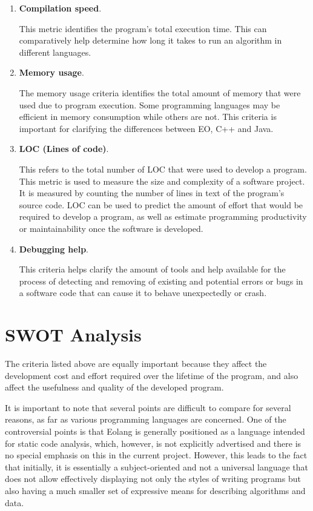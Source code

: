 \documentclass[12pt]{book}
\begin{document}
{{\begin{enumerate}
    \item \textbf{Compilation speed}.
    
This metric identifies the program's total execution time. This can comparatively help determine how long it takes to run an algorithm in different languages.

    \item \textbf{Memory usage}.
    
The memory usage criteria identifies the  total amount of memory that were used due to program execution. Some programming languages may be efficient in memory consumption while others are not. This criteria is important for clarifying the differences between EO, C++ and Java.

    \item \textbf{LOC (Lines of code)}.
    
This refers to the total number of LOC that were used to develop a program. This metric is used to measure the size and complexity of a software project. It is measured by counting the number of lines in text of the program's source code. LOC can be used to predict the amount of effort that would be required to develop a program, as well as estimate programming productivity or maintainability once the software is developed.

    \item \textbf{Debugging help}.
    
This criteria helps clarify the amount of tools and help available for the process of detecting and removing of existing and potential errors or bugs in a software code that can cause it to behave unexpectedly or crash.
\end{enumerate}

\section{SWOT Analysis}

The criteria listed above are equally important because they affect the development cost and effort required over the lifetime of the program, and also affect the usefulness and quality of the developed program.

It is important to note that several points are difficult to compare for several reasons, as far as various programming languages are concerned. One of the controversial points is that Eolang is generally positioned as a language intended for static code analysis, which, however, is not explicitly advertised and there is no special emphasis on this in the current project. However, this leads to the fact that initially, it is essentially a subject-oriented and not a universal language that does not allow effectively displaying not only the styles of writing programs but also having a much smaller set of expressive means for describing algorithms and data.

}}
\end{document}
